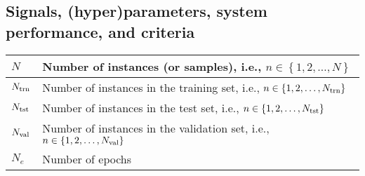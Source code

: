 \documentclass{article}
\begin{document}
\subsection{Signals, (hyper)parameters, system performance, and criteria}
\begin{xltabular}{\textwidth}{XX}
	\(N\)                                                                                                                                                                          & Number of instances (or samples), i.e., \(n \in \left\{ 1, 2, \dots, N \right\}\)                                                                                                                                                                                                                                                      \\ \hline
	\(N_{\textnormal{trn}}\)                                                                                                                                                       & Number of instances in the training set, i.e., \(n \in \left\{ 1, 2, \dots, N_\textnormal{trn} \right\}\)                                                                                                                                                                                                                              \\ \hline
	\(N_{\textnormal{tst}}\)                                                                                                                                                       & Number of instances in the test set, i.e., \(n \in \left\{ 1, 2, \dots, N_\textnormal{tst} \right\}\)                                                                                                                                                                                                                                  \\ \hline
	\(N_{\textnormal{val}}\)                                                                                                                                                       & Number of instances in the validation set, i.e., \(n \in \left\{ 1, 2, \dots, N_\textnormal{val} \right\}\)                                                                                                                                                                                                                            \\ \hline
	\(N_e\)                                                                                                                                                                        & Number of epochs                                                                                                                                                                                                                                                                                                                       \\ \hline

\end{xltabular}
\end{document}
